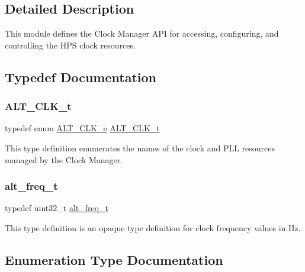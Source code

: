 \subsection{Detailed Description}
This module defines the Clock Manager A\+PI for accessing, configuring, and controlling the H\+PS clock resources. 

\subsection{Typedef Documentation}
\mbox{\label{group__CLK__MGR_ga4cdb80e84284365fe3d47c2f8050b13d}} 
\subsubsection{\texorpdfstring{ALT\_CLK\_t}{ALT\_CLK\_t}}
{\footnotesize\ttfamily typedef enum \mbox{\hyperlink{group__CLK__MGR_ga931510957187a22cb4e6adef8d9d105a}{A\+L\+T\+\_\+\+C\+L\+K\+\_\+e}}  \mbox{\hyperlink{group__CLK__MGR_ga4cdb80e84284365fe3d47c2f8050b13d}{A\+L\+T\+\_\+\+C\+L\+K\+\_\+t}}}

This type definition enumerates the names of the clock and P\+LL resources managed by the Clock Manager. \mbox{\label{group__CLK__MGR_gaa32fe6dfaa6def16098e0039eb336383}} 
\subsubsection{\texorpdfstring{alt\_freq\_t}{alt\_freq\_t}}
{\footnotesize\ttfamily typedef uint32\+\_\+t \mbox{\hyperlink{group__CLK__MGR_gaa32fe6dfaa6def16098e0039eb336383}{alt\+\_\+freq\+\_\+t}}}

This type definition is an opaque type definition for clock frequency values in Hz. 

\subsection{Enumeration Type Documentation}
\mbox{\label{group__CLK__MGR_ga931510957187a22cb4e6adef8d9d105a}} 

